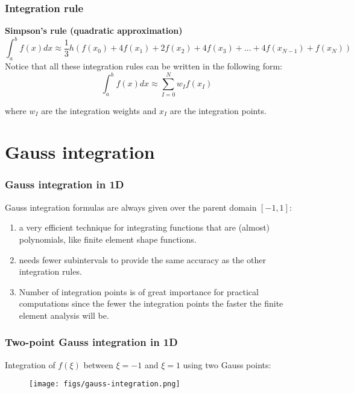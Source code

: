 \documentclass[notes]{beamer}
\begin{document}
\begin{frame}
\frametitle{Integration rule}
\textbf{Simpson's rule (quadratic approximation)}
\begin{equation*}
	\int_a^b f(x)dx \approx \frac{1}{3} h (f(x_0) + 4f(x_1) + 2f(x_2) + 4f(x_3) +\dots + 4f(x_{N-1}) + f(x_N))
\end{equation*}
Notice that all these integration rules can be written in the following form:
\begin{equation*}
	\int_a^b f(x)dx \approx \sum_{I=0}^N w_I f(x_I)
\end{equation*}

where $w_I$ are the integration weights and $x_I$ are the integration points.
\end{frame}

\section{Gauss integration}
\begin{frame}
\frametitle{Gauss integration in 1D}
Gauss integration formulas are always given over the parent domain $[-1, 1]$:
	
	\begin{enumerate}
		\item a very efficient technique for integrating functions that are (almost)
		polynomials, like finite element shape functions.
		
		\item needs fewer subintervals to provide the same accuracy as the other integration rules.
		
		\item Number of integration points is of great importance for practical computations since
		the fewer the integration points the faster the finite element analysis will be.
	\end{enumerate}
\end{frame}

\begin{frame}
\frametitle{Two-point Gauss integration in 1D}
Integration of $f(\xi)$ between $\xi = -1$ and $\xi = 1 $ using two Gauss points:
	
	\begin{figure}[ht]
		\centering
		\texttt{[image: figs/gauss-integration.png]}
	\end{figure}
\end{frame}
\end{document}
